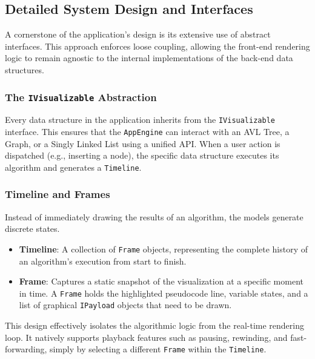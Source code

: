 \subsection{Detailed System Design and Interfaces}

A cornerstone of the application's design is its extensive use of abstract interfaces. This approach enforces loose coupling, allowing the front-end rendering logic to remain agnostic to the internal implementations of the back-end data structures.

\subsubsection{The \texttt{IVisualizable} Abstraction}
Every data structure in the application inherits from the \texttt{IVisualizable} interface. This ensures that the \texttt{AppEngine} can interact with an AVL Tree, a Graph, or a Singly Linked List using a unified API. When a user action is dispatched (e.g., inserting a node), the specific data structure executes its algorithm and generates a \texttt{Timeline}.

\subsubsection{Timeline and Frames}
Instead of immediately drawing the results of an algorithm, the models generate discrete states.
\begin{itemize}
    \item \textbf{Timeline}: A collection of \texttt{Frame} objects, representing the complete history of an algorithm's execution from start to finish.
    \item \textbf{Frame}: Captures a static snapshot of the visualization at a specific moment in time. A \texttt{Frame} holds the highlighted pseudocode line, variable states, and a list of graphical \texttt{IPayload} objects that need to be drawn.
\end{itemize}
This design effectively isolates the algorithmic logic from the real-time rendering loop. It natively supports playback features such as pausing, rewinding, and fast-forwarding, simply by selecting a different \texttt{Frame} within the \texttt{Timeline}.


